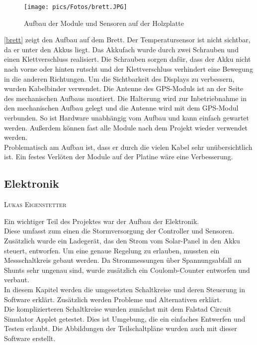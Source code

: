 \documentclass[12pt,a4paper,bibliography=totocnumbered,listof=totocnumbered]{article}
\makeatletter
\newcommand{\chapterauthor}[1]{%
  {\parindent0pt\vspace*{-5pt}%
  \linespread{1.1}\small\scshape#1%
  \par\nobreak\vspace*{3pt}}
  \@afterheading%
}
\makeatother
\begin{document}
\begin{figure}[htpb]
    \centering
    \texttt{[image: pics/Fotos/brett.JPG]}
    \caption{Aufbau der Module und Sensoren auf der Holzplatte}\label{brett}
\end{figure}

\autoref{brett} zeigt den Aufbau auf dem Brett.
Der Temperatursensor ist nicht sichtbar, da er unter den Akkus liegt.
Das Akkufach wurde durch zwei Schrauben und einen Klettverschluss realisiert.
Die Schrauben sorgen dafür, dass der Akku nicht nach vorne oder hinten rutscht und der Klettverschluss verhindert eine Bewegung in die anderen Richtungen.
Um die Sichtbarkeit des Displays zu verbessern, wurden Kabelbinder verwendet.
Die Antenne des GPS-Moduls ist an der Seite des mechanischen Aufbaus montiert.
Die Halterung wird zur Inbetriebnahme in den mechanischen Aufbau gelegt und die Antenne wird mit dem GPS-Modul verbunden.
So ist Hardware unabhängig vom Aufbau und kann einfach gewartet werden.
Außerdem können fast alle Module nach dem Projekt wieder verwendet werden.\\
Problematisch am Aufbau ist, dass er durch die vielen Kabel sehr unübersichtlich ist.
Ein festes Verlöten der Module auf der Platine wäre eine Verbesserung.





\subsection{Elektronik}
\chapterauthor{Lukas Eigenstetter}
Ein wichtiger Teil des Projektes war der Aufbau der Elektronik.\\
Diese umfasst zum einen die Stormversorgung der Controller und Sensoren.
Zusätzlich wurde ein Ladegerät, das den Strom vom Solar-Panel in den Akku steuert, entworfen.
Um eine genaue Regelung zu erlauben, mussten ein Messschaltkreis gebaut werden.
Da Strommessungen über Spannungsabfall an Shunts sehr ungenau sind, wurde zusätzlich ein Coulomb-Counter entworfen und verbaut.\\
In diesem Kapitel werden die umgesetzten Schaltkreise und deren Steuerung in Software erklärt.
Zusätzlich werden Probleme und Alternativen erklärt.\\
Die komplizierteren Schaltkreise wurden zunächst mit dem Falstad Circuit Simulator Applet getestet. \autocite{falstad}
Dies ist Umgebung, die ein einfaches Entwerfen und Testen erlaubt.
Die Abbildungen der Teilschaltpläne wurden auch mit dieser Software erstellt.
\end{document}
